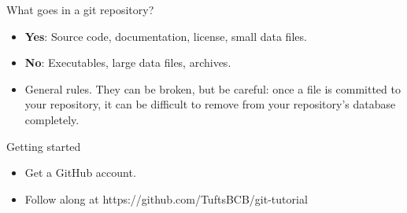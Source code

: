 \documentclass{beamer}
\newenvironment{myitemize}{
  \begin{itemize}
  \setlength{\itemsep}{5pt}
}{\end{itemize}}
\begin{document}
\begin{frame}[t,fragile]{What goes in a git repository?}
\begin{myitemize}
  \item<1->
    \textbf{Yes}: Source code, documentation, license, small data files.
  \item<2->
    \textbf{No}: Executables, large data files, archives.
  \item<3->
    General rules. They can be broken, but be careful: once a file is
    committed to your repository, it can be difficult to remove from your
    repository's database completely.
\end{myitemize}
\end{frame}

\begin{frame}[t,fragile]{Getting started}
\begin{myitemize}
  \item<1->
    Get a GitHub account.
  \item<2->
    Follow along at https://github.com/TuftsBCB/git-tutorial
\end{myitemize}
\end{frame}
\end{document}
